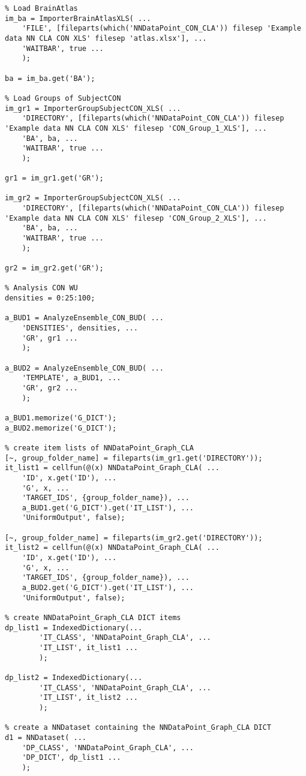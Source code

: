 \documentclass{tufte-handout}
\begin{document}
\begin{lstlisting}
% Load BrainAtlas
im_ba = ImporterBrainAtlasXLS( ...
    'FILE', [fileparts(which('NNDataPoint_CON_CLA')) filesep 'Example data NN CLA CON XLS' filesep 'atlas.xlsx'], ...
    'WAITBAR', true ...
    );

ba = im_ba.get('BA');

% Load Groups of SubjectCON
im_gr1 = ImporterGroupSubjectCON_XLS( ...
    'DIRECTORY', [fileparts(which('NNDataPoint_CON_CLA')) filesep 'Example data NN CLA CON XLS' filesep 'CON_Group_1_XLS'], ...
    'BA', ba, ...
    'WAITBAR', true ...
    );

gr1 = im_gr1.get('GR');

im_gr2 = ImporterGroupSubjectCON_XLS( ...
    'DIRECTORY', [fileparts(which('NNDataPoint_CON_CLA')) filesep 'Example data NN CLA CON XLS' filesep 'CON_Group_2_XLS'], ...
    'BA', ba, ...
    'WAITBAR', true ...
    );

gr2 = im_gr2.get('GR');

% Analysis CON WU
densities = 0:25:100;

a_BUD1 = AnalyzeEnsemble_CON_BUD( ...
    'DENSITIES', densities, ...
    'GR', gr1 ...
    );

a_BUD2 = AnalyzeEnsemble_CON_BUD( ...
    'TEMPLATE', a_BUD1, ...
    'GR', gr2 ...
    );

a_BUD1.memorize('G_DICT');
a_BUD2.memorize('G_DICT');

% create item lists of NNDataPoint_Graph_CLA
[~, group_folder_name] = fileparts(im_gr1.get('DIRECTORY'));
it_list1 = cellfun(@(x) NNDataPoint_Graph_CLA( ...
    'ID', x.get('ID'), ...
    'G', x, ...
    'TARGET_IDS', {group_folder_name}), ...
    a_BUD1.get('G_DICT').get('IT_LIST'), ...
    'UniformOutput', false);

[~, group_folder_name] = fileparts(im_gr2.get('DIRECTORY'));
it_list2 = cellfun(@(x) NNDataPoint_Graph_CLA( ...
    'ID', x.get('ID'), ...
    'G', x, ...
    'TARGET_IDS', {group_folder_name}), ...
    a_BUD2.get('G_DICT').get('IT_LIST'), ...
    'UniformOutput', false);

% create NNDataPoint_Graph_CLA DICT items
dp_list1 = IndexedDictionary(...
        'IT_CLASS', 'NNDataPoint_Graph_CLA', ...
        'IT_LIST', it_list1 ...
        );

dp_list2 = IndexedDictionary(...
        'IT_CLASS', 'NNDataPoint_Graph_CLA', ...
        'IT_LIST', it_list2 ...
        );

% create a NNDataset containing the NNDataPoint_Graph_CLA DICT
d1 = NNDataset( ...
    'DP_CLASS', 'NNDataPoint_Graph_CLA', ...
    'DP_DICT', dp_list1 ...
    );


\end{lstlisting}
\end{document}
